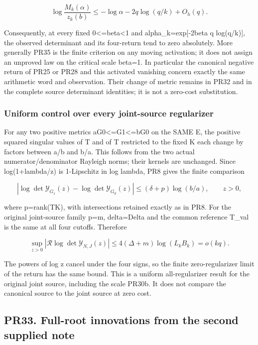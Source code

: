 \documentclass[11pt]{article}
\begin{document}
\[
\log\frac{M_k(\alpha)}{z_k(b)}
\le-\log\alpha-2q\log(q/k)+O_h(q).
\tag{PR35}
\]

Consequently, at every fixed 0\textless=beta\textless1 and alpha\_k=exp{[}-2beta q log(q/k){]}, the observed determinant and its four-return tend to zero absolutely. More generally PR35 is the finite criterion on any moving activation; it does not assign an unproved law on the critical scale beta=1. In particular the canonical negative return of PR25 or PR28 and this activated vanishing concern exactly the same arithmetic word and observation. Their change of metric remains in PR32 and in the complete source determinant identities; it is not a zero-cost substitution.

\subsubsection{Uniform control over every joint-source regularizer}\label{uniform-control-over-every-joint-source-regularizer}

For any two positive metrics aG0\textless=G1\textless=bG0 on the SAME E, the positive squared singular values of T and of T restricted to the fixed K each change by factors between a/b and b/a. This follows from the two actual numerator/denominator Rayleigh norms; their kernels are unchanged. Since log(1+lambda/z) is 1-Lipschitz in log lambda, PR8 gives the finite comparison

\[
\boxed{
|\log\det\mathscr Y_{G_1}(z)-\log\det\mathscr Y_{G_0}(z)|
\le(\delta+p)\log(b/a),\qquad z>0,
}
\tag{PR35a}
\]

where p=rank(T\textbar K), with intersections retained exactly as in PR8. For the original joint-source family p=m, delta=Delta and the common reference T\_val is the same at all four cutoffs. Therefore

\[
\boxed{
\sup_{z>0}\left|\mathcal R\log\det\mathscr Y_{N,J}(z)\right|
\le4(\Delta+m)\log(L_kB_k)=o(kq).
}
\tag{PR35b}
\]

The powers of log z cancel under the four signs, so the finite zero-regularizer limit of the return has the same bound. This is a uniform all-regularizer result for the original joint source, including the scale PR30b. It does not compare the canonical source to the joint source at zero cost.

\subsection{PR33. Full-root innovations from the second supplied note}\label{pr33.-full-root-innovations-from-the-second-supplied-note}
\end{document}
